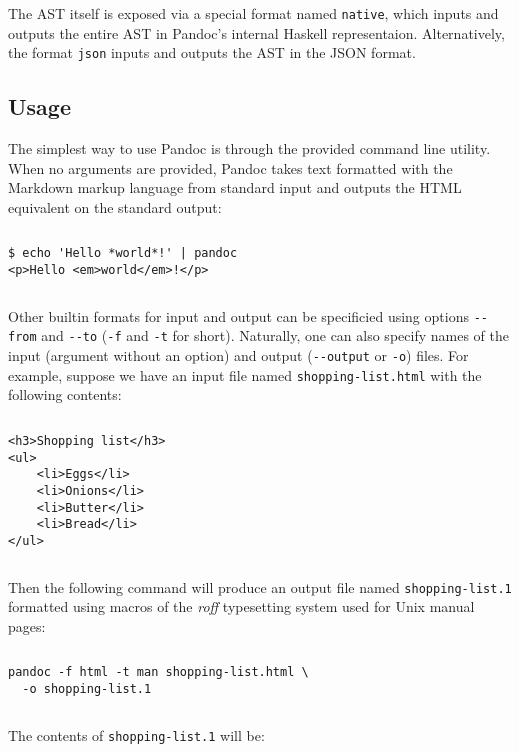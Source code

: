 \documentclass[
  digital,     %
  oneside,     %
  nosansbold,  %
  nocolorbold, %
  lof,         %
  nolot,       %
]{fithesis4}
\begin{document}
The AST itself is exposed via a special format named \texttt{native}, which inputs and outputs the entire AST in Pandoc's internal Haskell representaion. Alternatively, the format \texttt{json} inputs and outputs the AST in the JSON format.

\subsection{Usage}

The simplest way to use Pandoc is through the provided command line utility. When no arguments are provided, Pandoc takes text formatted with the Markdown markup language from standard input and outputs the HTML equivalent on the standard output:

$ $

\noindent
\begin{lstlisting}
$ echo 'Hello *world*!' | pandoc
<p>Hello <em>world</em>!</p>
\end{lstlisting}

$ $

\noindent
Other builtin formats for input and output can be specificied using options \texttt{-{}-from} and \texttt{-{}-to} (\texttt{-f} and \texttt{-t} for short). Naturally, one can also specify names of the input (argument without an option) and output (\texttt{-{}-output} or \texttt{-o}) files. For example, suppose we have an input file named \texttt{shopping-list.html} with the following contents:

$ $

\noindent
\lstset{language=HTML}
\begin{lstlisting}
<h3>Shopping list</h3>
<ul>
    <li>Eggs</li>
    <li>Onions</li>
    <li>Butter</li>
    <li>Bread</li>
</ul>
\end{lstlisting}

$ $

\noindent
Then the following command will produce an output file named \texttt{shopping-list.1} formatted using macros of the \textit{roff} typesetting system used for Unix manual pages:

$ $

\noindent
\lstset{language=}
\begin{lstlisting}
pandoc -f html -t man shopping-list.html \
  -o shopping-list.1
\end{lstlisting}

$ $

\noindent
The contents of \texttt{shopping-list.1} will be:
\end{document}
